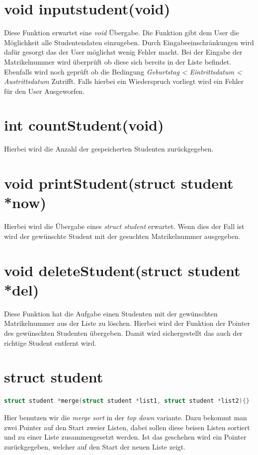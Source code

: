 \documentclass[a4paper, 11pt, oneside]{book} %
\begin{document}
\section{void inputstudent(void)}
Diese Funktion erwartet eine \textit{void} Übergabe. Die Funktion gibt dem User die Möglichkeit alle Studentendaten einzugeben. Durch Eingabeeinschränkungen wird dafür gesorgt das der User möglichst wenig Fehler macht. \newline Bei der Eingabe der Matrikelnummer wird überprüft ob diese sich bereits in der Liste befindet. \newline Ebenfalls wird noch geprüft ob die Bedingung \newline \textit{Geburtstag < Eintrittsdatum < Austrittsdatum} Zutrifft. Falls hierbei ein Wiederspruch vorliegt wird ein Fehler für den User Ausgeworfen.
\section{int countStudent(void)}
Hierbei wird die Anzahl der gespeicherten Studenten zurückgegeben.


\section{void printStudent(struct student *now)}
Hierbei wird die Übergabe eines \textit{struct student} erwartet. Wenn dies der Fall ist wird der gewünschte Student mit der gesuchten Matrikelnummer ausgegeben.

\section{void deleteStudent(struct student *del)}
Diese Funktion hat die Aufgabe einen Studenten mit der gewünschten Matrikelnummer aus der Liste zu löschen. Hierbei wird der Funktion der Pointer des gewünschten Studenten übergeben. Damit wird sichergestellt das auch der richtige Student entfernt wird.

\section{struct student}
\begin{lstlisting}[language=C]
	struct student *merge(struct student *list1, struct student *list2){}
\end{lstlisting}
Hier benutzen wir die \textit{merge sort} in der \textit{top down} variante. Dazu bekommt man zwei Pointer auf den Start zweier Listen, dabei sollen diese beisen Listen sortiert und zu einer Liste zusammengesetzt werden. Ist das geschehen wird ein Pointer zurückgegeben, welcher auf den Start der neuen Liste zeigt.
\end{document}
